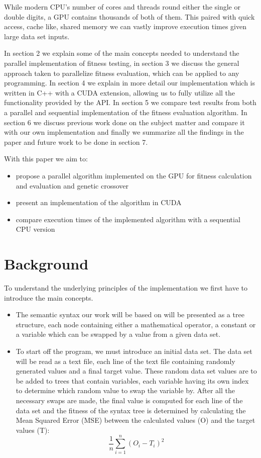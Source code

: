 \documentclass[runningheads]{llncs}
\begin{document}
While modern CPU's number of cores and threads round either the single or double digits, a GPU contains thousands of both of them. This paired with quick access, cache like, shared memory we can vastly improve execution times given large data set inputs.

In section 2 we explain some of the main concepts needed to understand the parallel implementation of fitness testing, in section 3 we discuss the general approach taken to parallelize fitness evaluation, which can be applied to any programming. In section 4 we explain in more detail our implementation which is written in C++ with a CUDA extension, allowing us to fully utilize all the functionality provided by the API. In section 5 we compare test results from both a parallel and sequential implementation of the fitness evaluation algorithm. In section 6 we discuss previous work done on the subject matter and compare it with our own implementation and finally we summarize all the findings in the paper and future work to be done in section 7.

With this paper we aim to:
\begin{itemize}
	\item propose a parallel algorithm implemented on the GPU for fitness calculation and evaluation and genetic crossover
	\item present an implementation of the algorithm in CUDA
	\item compare execution times of the implemented algorithm with a sequential CPU version
\end{itemize}


\section{Background}
To understand the underlying principles of the implementation we first have to introduce the main concepts.
\begin{itemize}
	\item The semantic syntax our work will be based on will be presented as a tree structure, each node containing either a mathematical operator, a constant or a variable which can be swapped by a value from a given data set.
	\item To start off the program, we must introduce an initial data set. The data set will be read as a text file, each line of the text file containing randomly generated values and a final target value. These random data set values are to be added to trees that contain variables, each variable having its own index to determine which random value to swap the variable by. After all the necessary swaps are made, the final value is computed for each line of the data set and the fitness of the syntax tree is determined by calculating the Mean Squared Error (MSE) between the calculated values (O) and the target values (T): $$\frac{1}{n}\sum_{i=1}^{n} (O_i - T_i)^{2}$$
\end{itemize}
\end{document}
